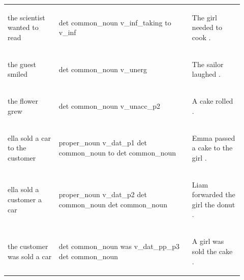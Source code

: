 \documentclass[11pt]{article}
\begin{document}
\begin{table}
\begin{tabular}{p{0.2\linewidth} p{0.52\linewidth} p{0.2\linewidth}}
\begin{small}the scientist wanted to read\end{small} & \begin{small}det common\_noun v\_inf\_taking to v\_inf \end{small} & \begin{small}The girl needed to cook .\end{small} \\
\begin{small}the guest smiled\end{small} & \begin{small}det common\_noun v\_unerg \end{small} & \begin{small}The sailor laughed .\end{small} \\
\begin{small}the flower grew\end{small} & \begin{small}det common\_noun v\_unacc\_p2 \end{small} & \begin{small}A cake rolled .\end{small} \\
\begin{small}ella sold a car to the customer\end{small} & \begin{small}proper\_noun v\_dat\_p1 det common\_noun to det common\_noun \end{small} & \begin{small}Emma passed a cake to the girl .\end{small} \\
\begin{small}ella sold a customer a car\end{small} & \begin{small}proper\_noun v\_dat\_p2 det common\_noun det common\_noun \end{small} & \begin{small}Liam forwarded the girl the donut .\end{small} \\
\begin{small}the customer was sold a car\end{small} & \begin{small}det common\_noun was v\_dat\_pp\_p3 det common\_noun \end{small} & \begin{small}A girl was sold the cake .\end{small} \\

\end{tabular}
\end{table}
\end{document}
